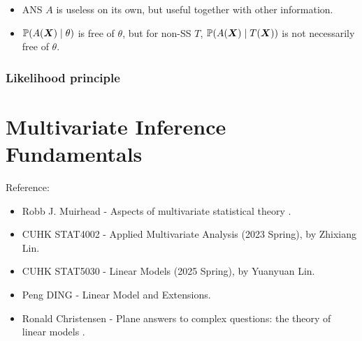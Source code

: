 \documentclass[10pt,a4paper]{book}
\begin{document}
\begin{remark}\label{rmk:SS-MSS-ANS-CS}
	\begin{itemize}
		\item ANS $A$ is useless on its own, but useful together with other information. 
		\item $\mathbb P(A({\boldsymbol X})\mid \theta)$ is free of $\theta$, but for non-SS $T$, $\mathbb P(A({\boldsymbol X})\mid T({\boldsymbol X}))$ is not necessarily free of $\theta$. 
	\end{itemize}
\end{remark}

\subsection{Likelihood principle}\label{sec:prin-data-reduce-lik}




\chapter{Multivariate Inference Fundamentals}\label{chap:multi}
Reference: 
\begin{itemize}
	\item Robb J. Muirhead - Aspects of multivariate statistical theory \cite{muirhead1982aspects}.
	\item CUHK STAT4002 - Applied Multivariate Analysis (2023 Spring), by Zhixiang Lin.
	\item CUHK STAT5030 - Linear Models (2025 Spring), by Yuanyuan Lin.
	\item Peng DING - Linear Model and Extensions.
	\item Ronald Christensen - Plane answers to
	complex questions: the theory of linear models \cite{christensen2002plane}.
\end{itemize}
\end{document}
